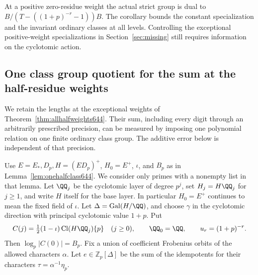 \documentclass[a4paper,11pt]{article}
\theoremstyle{definition}
\theoremstyle{remark}
\newcommand{\ZZ}{\mathbb Z}\newcommand{\ord}{\operatorname{ord}}
\numberwithin{equation}{section}
\newcommand{\Cl}{\operatorname{Cl}}
\begin{document}
At a positive zero-residue weight the actual strict group is
dual to \(B/(T-((1+p)^{-r}-1))B\). The corollary bounds the
constant specialization and the invariant ordinary classes at
all levels. Controlling the exceptional positive-weight
specializations in Section~\ref{sec:missing} still requires
information on the cyclotomic action.


\subsection{One class group quotient for the sum at the half-residue weights}
\label{sec:productweights647}

We retain the lengths at the exceptional weights of
Theorem~\ref{thm:allhalfweights644}. Their sum, including
every digit through an arbitrarily prescribed precision,
can be measured by imposing one polynomial relation on one
finite ordinary class group. The additive error below is
independent of that precision.

Use \(E=E_*,D_p,H=(ED_p)^+\), \(H_0=E^+\), \(\iota\), and
\(B_p\) as in Lemma~\ref{lem:onehalfclass644}. We consider
only primes with a nonempty list in that lemma. Let
\(\QQ_j\) be the cyclotomic layer of degree \(p^j\), set
\(H_j=H\QQ_j\) for \(j\ge1\), and write \(H\) itself for
the base layer. In particular \(H_0=E^+\) continues to
mean the fixed field of \(\iota\).
Let \(\Delta=\operatorname{Gal}(H/\QQ)\), and choose
\(\gamma\) in the cyclotomic direction with principal
cyclotomic value \(1+p\). Put
\[
 C(j)=\tfrac12(1-\iota)\Cl(H\QQ_j)\{p\}\quad(j\ge0),
 \qquad \QQ_0=\QQ,\qquad u_r=(1+p)^{-r}.
\]
Then \(\log_p|C(0)|=B_p\). Fix a union of coefficient
Frobenius orbits of the allowed characters \(\alpha\).
Let \(e\in\ZZ_p[\Delta]\) be the sum of the idempotents
for their characters \(\tau=\alpha^{-1}\eta_p\).
\end{document}
